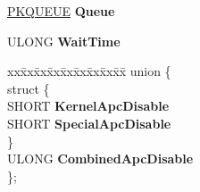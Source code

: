 \begin{DoxyCompactItemize}
\begin{tabbing}
\end{tabbing}\item 
\mbox{\label{struct___k_t_h_r_e_a_d_a0ec15e89dd5c0668f18ddc596cab9a3c}} 
\hyperlink{struct___k_q_u_e_u_e}{P\+K\+Q\+U\+E\+UE} {\bfseries Queue}
\item 
\mbox{\label{struct___k_t_h_r_e_a_d_aa0d38e6b75b9a881d045e216a5efdd1d}} 
U\+L\+O\+NG {\bfseries Wait\+Time}
\item 
\mbox{\label{struct___k_t_h_r_e_a_d_a1559880aaa9c95b96545ec85c1bf20b8}} 
\begin{tabbing}
xx\=xx\=xx\=xx\=xx\=xx\=xx\=xx\=xx\=\kill
union \{\\
\mbox{\label{union___k_t_h_r_e_a_d_1_1_0D2094_af36220b747b33442abaa143c48ac62c9}} 
\>struct \{\\
\>\>SHORT {\bfseries KernelApcDisable}\\
\>\>SHORT {\bfseries SpecialApcDisable}\\
\>\} \\
\>ULONG {\bfseries CombinedApcDisable}\\
\}; \\


\end{tabbing}
\end{DoxyCompactItemize}
